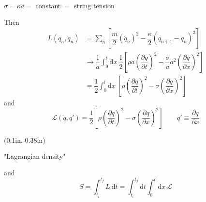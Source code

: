 \documentclass{article}
\begin{document}
$\sigma = \kappa a =$ constant $=$ string tension

\noindent Then
\begin{align*}
    L ( q_n, \dot{q}_n ) &= \sum_n \left[ \dfrac{m}{2} ( \dot{q}_n )^2 - \dfrac{\kappa}{2} ( q_{n+1} - q_n )^2 \right] \\
    &\rightarrow \dfrac{1}{a} \int_0^l \mathrm{d}x~ \dfrac{1}{2} \left[ \rho a { \left( \dfrac{ \partial q }{ \partial t } \right) }^2 - \dfrac{\sigma}{a} a^2 { \left( \dfrac{ \partial q }{ \partial x } \right) }^2 \right] \\
    &= \dfrac{1}{2} \int_0^l \mathrm{d}x~ \left[ \rho { \left( \dfrac{ \partial q }{ \partial t } \right) }^2 - \sigma { \left( \dfrac{ \partial q }{ \partial x } \right) }^2 \right]
\end{align*}
and
\begin{equation*}
    \mathscr{L} ( \dot{q}, q' ) = \dfrac{1}{2} \left[ \rho { \left( \dfrac{ \partial q }{ \partial t } \right) }^2 - \sigma { \left( \dfrac{ \partial q }{ \partial x } \right) }^2 \right] %
    \qquad \boxed{ q' \equiv \dfrac{ \partial q }{ \partial x } }
\end{equation*}
{%
\begin{textblock*}{2in}(0.1in,-0.38in)%
\begin{minipage}[h!]{2in}
    "Lagrangian density"
\end{minipage}%
\end{textblock*}%
}%
and
\begin{equation*}
    S = \int_{t_i}^{t_f} L ~ \mathrm{d}t = \int_{t_i}^{t_f} \mathrm{d}t \int_0^l \mathrm{d}x~ \mathscr{L}
\end{equation*}

\end{document}
